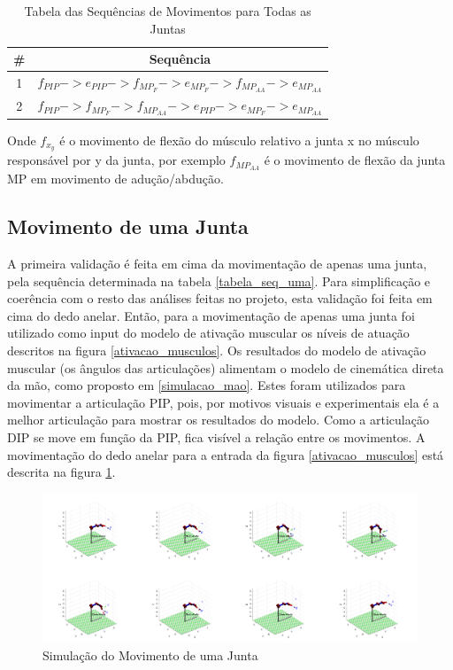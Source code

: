 \begin{table}[H]
\centering
\caption{Tabela das Sequências de Movimentos para Todas as Juntas}
\label{tabela_sequencia_movimentos}
\begin{tabular}{|c|c|}
	\hline
    \# & Sequência \\ \hline
    1 & $f_{PIP} -> e_{PIP} -> f_{MP_{F}} -> e_{MP_{F}} -> f_{MP_{AA}} -> e_{MP_{AA}}$  \\ \hline
    2 & $f_{PIP} -> f_{MP_{F}} -> f_{MP_{AA}} -> e_{PIP} -> e_{MP_{F}} -> e_{MP_{AA}}$ \\ \hline
\end{tabular}
\end{table}

Onde $f_{x_y}$ é o movimento de flexão do músculo relativo a junta x no músculo responsável por y da junta, por exemplo $f_{MP_{AA}}$ é o movimento de flexão da junta MP em movimento de adução/abdução.

\subsection{Movimento de uma Junta}
A primeira validação é feita em cima da movimentação de apenas uma junta, pela sequência determinada na tabela \ref{tabela_seq_uma}. Para simplificação e coerência com o resto das análises feitas no projeto, esta validação foi feita em cima do dedo anelar. Então, para a movimentação de apenas uma junta foi utilizado como input do modelo de ativação muscular os níveis de atuação descritos na figura \ref{ativacao_musculos}. Os resultados do modelo de ativação muscular (os ângulos das articulações) alimentam o modelo de cinemática direta da mão, como proposto em \ref{simulacao_mao}. Estes foram utilizados para movimentar a articulação PIP, pois, por motivos visuais e experimentais ela é a melhor articulação para mostrar os resultados do modelo. Como a articulação DIP se move em função da PIP, fica visível a relação entre os movimentos. A movimentação do dedo anelar para a entrada da figura \ref{ativacao_musculos} está descrita na figura \ref{movimentacao_uma_junta}.

\begin{figure}[H]
\centering
\includegraphics[width = 1\textwidth]{img/sim_uma_junta.png}
\caption[Simulação do Movimento de uma Junta]{Simulação do Movimento de uma Junta}
\label{movimentacao_uma_junta}
\end{figure}

